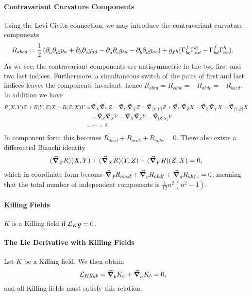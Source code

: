 \paragraph{Contravariant Curvature Components}
Using the Levi-Civita connection, we may introduce the contravariant curvature components
\begin{align*}
	R_{abcd} &= \frac{1}{2}\left(\del{a}{\del{d}{g_{bc}}} + \del{b}{\del{c}{g_{ad}}} - \del{a}{\del{c}{g_{bd}}} - \del{b}{\del{d}{g_{ac}}}\right) + g_{fh}(\chris{f}{b}{c}\chris{h}{a}{d} - \chris{f}{b}{d}\chris{h}{a}{c}).
\end{align*}
As we see, the contravariant components are antisymmetric in the two first and two last indices. Furthermore, a simultaneous switch of the pairs of first and last indices leaves the components invariant, hence $R_{abcd} = R_{cdab} = -R_{abdc} = -R_{bacd}$. In addition we have
\begin{align*}
	R(X, Y)Z + R(Y, Z)X + R(Z, X)Y =& \dcov{X}{\dcov{Y}{Z}} - \dcov{Y}{\dcov{X}{Z}} - \dcov{\comm{X}{Y}}{Z} + \dcov{Y}{\dcov{Z}{X}} - \dcov{Z}{\dcov{Y}{X}} - \dcov{\comm{Y}{Z}}{X} \\
	                                &+ \dcov{Z}{\dcov{X}{Y}} - \dcov{X}{\dcov{Z}{Y}} - \dcov{\comm{Z}{X}}{Y} \\
	                               =& \dots = 0.
\end{align*}
In component form this becomes $R_{abcd} + R_{acdb} + R_{adbc} = 0$. There also exists a differential Bianchi identity
\begin{align*}
	(\grad_{Z}^{}{R})(X, Y) + (\grad_{X}^{}{R})(Y, Z) + (\grad_{Y}^{}{R})(Z, X) = 0,
\end{align*}
which in coordinate form becoms $\grad_{f}^{}{R_{abcd}} + \grad_{c}^{}{R_{abdf}} + \grad_{d}^{}{R_{abfc}} = 0$, meaning that the total number of independent components is $\frac{1}{12}n^{2}(n^{2} - 1)$.

\paragraph{Killing Fields}
$K$ is a Killing field if $\mathcal{L}_{K}g = 0$.

\paragraph{The Lie Derivative with Killing Fields}
Let $K$ be a Killing field. We then obtain
\begin{align*}
	\mathcal{L}_{K}g_{ab} &= \grad_{b}^{}{K_{a}} + \grad_{a}^{}{K_{b}} = 0,
\end{align*}
and all Killing fields must satisfy this relation.

